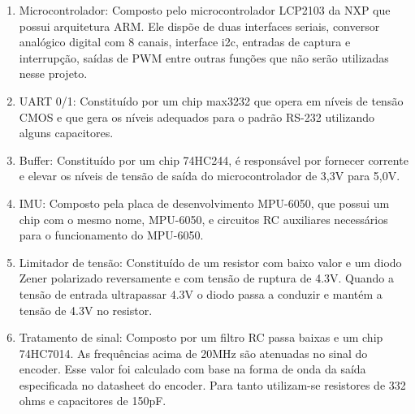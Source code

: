 \begin{enumerate}[topsep=0pt, partopsep=0pt, itemsep=0pt]
    \item Microcontrolador: Composto pelo microcontrolador LCP2103 da NXP que possui arquitetura ARM. Ele dispõe de duas interfaces seriais, conversor analógico digital com 8 canais, interface i2c, entradas de captura e interrupção, saídas de PWM entre outras funções que não serão utilizadas nesse projeto.
    \item UART 0/1: Constituído por um chip max3232 que opera em níveis de tensão CMOS e que gera os níveis adequados para o padrão RS-232 utilizando alguns capacitores.
    \item Buffer: Constituído por um chip 74HC244, é responsável por fornecer corrente e elevar os níveis de tensão de saída do microcontrolador de 3,3V para 5,0V.
    \item IMU: Composto pela placa de desenvolvimento MPU-6050, que possui um chip com o mesmo nome, MPU-6050, e circuitos RC auxiliares necessários para o funcionamento do MPU-6050.
    \item Limitador de tensão: Constituído de um resistor com baixo valor e um diodo Zener polarizado reversamente e com tensão de ruptura de 4.3V. Quando a tensão de entrada ultrapassar 4.3V o diodo passa a conduzir e mantém a tensão de 4.3V no resistor.
    \item Tratamento de sinal: Composto por um filtro RC passa baixas e um chip 74HC7014. As frequências acima de 20MHz são atenuadas no sinal do encoder. Esse valor foi calculado com base na forma de onda da saída especificada no datasheet do encoder. Para tanto utilizam-se resistores de 332 ohms e capacitores de 150pF.
\end{enumerate}

